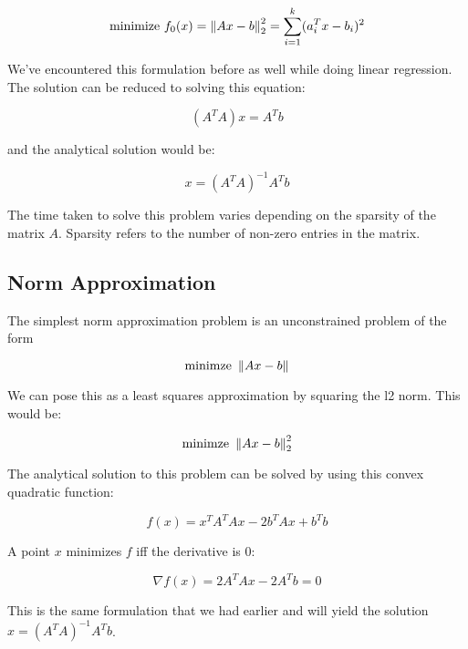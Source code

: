\begin{align}
    \text{minimize }f_0(x)=\left\lVert Ax-b\right\rVert_2^2 = \sum_{i=1}^k(a_i^Tx-b_i)^2
\end{align}

We've encountered this formulation before as well while doing linear regression. The solution can be reduced to solving this equation:

\begin{equation}
    (A^TA)x=A^Tb
\end{equation}

and the analytical solution would be:

\begin{equation}
    x=(A^TA)^{-1}A^Tb
\end{equation}

The time taken to solve this problem varies depending on the sparsity of the matrix $A$. Sparsity refers to the number of non-zero entries in the matrix.

\subsection{Norm Approximation}

The simplest norm approximation problem is an unconstrained problem of the form

\begin{equation}
    \text{minimze } \left\lVert Ax-b\right\rVert
\end{equation}

We can pose this as a least squares approximation by squaring the l2 norm. This would be:

\begin{equation}
        \text{minimze } \left\lVert Ax-b\right\rVert_2^2
\end{equation}

The analytical solution to this problem can be solved by using this convex quadratic function:

\begin{equation}
    f(x) = x^TA^TAx - 2b^TAx + b^Tb
\end{equation}

A point $x$ minimizes $f$ iff the derivative is 0:

\begin{equation}
    \nabla f(x) = 2A^TAx - 2A^Tb = 0
\end{equation}

This is the same formulation that we had earlier and will yield the solution $x=(A^TA)^{-1}A^Tb$.

